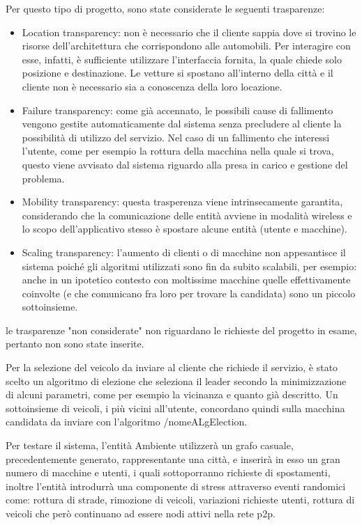 Per questo tipo di progetto, sono state considerate le seguenti trasparenze: 
\begin{itemize}
	\item Location transparency: non è necessario che il cliente sappia dove si trovino le risorse dell'architettura che corrispondono alle automobili. Per interagire con esse, infatti, è sufficiente utilizzare l'interfaccia fornita, la quale chiede solo posizione e destinazione. Le vetture si spostano all'interno della città e il cliente non è necessario sia a conoscenza della loro locazione.
	\item Failure transparency: come già accennato, le possibili cause di fallimento vengono gestite automaticamente dal sistema senza precludere al cliente la possibilità di utilizzo del servizio. Nel caso di un fallimento che interessi l'utente, come per esempio la rottura della macchina nella quale si trova, questo viene avvisato dal sistema riguardo alla presa in carico e gestione del problema.
	\item Mobility transparency: questa trasperenza viene intrinsecamente garantita, considerando che la comunicazione delle entità avviene in modalità wireless e lo scopo dell'applicativo stesso è spostare alcune entità (utente e macchine).
	\item Scaling transparency: l'aumento di clienti o di macchine non appesantisce il sistema poiché gli algoritmi utilizzati sono fin da subito scalabili, per esempio: anche in un ipotetico contesto con moltissime macchine quelle effettivamente coinvolte (e che comunicano fra loro per trovare la candidata) sono un piccolo sottoinsieme. 
\end{itemize}
le trasparenze "non considerate" non riguardano le richieste del progetto in esame, pertanto non sono state inserite.

Per la selezione del veicolo da inviare al cliente che richiede il servizio, è stato scelto un algoritmo di elezione che seleziona il leader secondo la minimizzazione di alcuni parametri, come per esempio la vicinanza e quanto già descritto. Un sottoinsieme di veicoli, i più vicini all'utente, concordano quindi sulla macchina candidata da inviare con l'algoritmo /nomeALgElection.

Per testare il sistema, l'entità Ambiente utilizzerà un grafo casuale, precedentemente generato, rappresentante una città, e inserirà in esso un gran numero di macchine e utenti, i quali sottoporranno richieste di spostamenti, inoltre l'entità introdurrà una componente di stress attraverso eventi randomici come: rottura di strade, rimozione di veicoli, variazioni richieste utenti, rottura di veicoli che però continuano ad essere nodi attivi nella rete p2p. 

